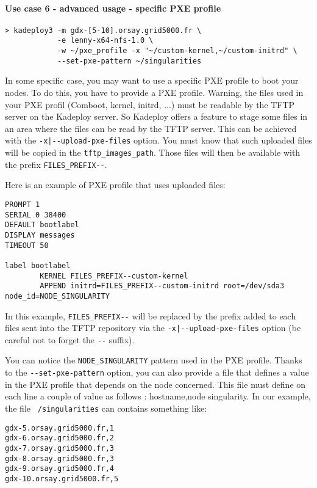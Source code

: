 \documentclass[a4wide,10pt,oneside]{book}
\begin{document}
\paragraph{Use case 6 - advanced usage - specific PXE profile}
\begin{verbatim}
> kadeploy3 -m gdx-[5-10].orsay.grid5000.fr \
            -e lenny-x64-nfs-1.0 \
            -w ~/pxe_profile -x "~/custom-kernel,~/custom-initrd" \
            --set-pxe-pattern ~/singularities
\end{verbatim}
In some specific case, you may want to use a specific PXE profile to boot your nodes. To do this, you have to provide a PXE profile. Warning, the files used in your PXE profil (Comboot, kernel, initrd, ...) must be readable by the TFTP server on the Kadeploy server. So Kadeploy offers a feature to stage some files in an area where the files can be read by the TFTP server. This can be achieved with the \texttt{-x|-{}-upload-pxe-files} option. You must know that such uploaded files will be copied in the \texttt{tftp\_images\_path}. Those files will then be available with the prefix \texttt{FILES\_PREFIX-{}-}.

Here is an example of PXE profile that uses uploaded files:
\begin{verbatim}
PROMPT 1
SERIAL 0 38400
DEFAULT bootlabel
DISPLAY messages
TIMEOUT 50

label bootlabel
        KERNEL FILES_PREFIX--custom-kernel
        APPEND initrd=FILES_PREFIX--custom-initrd root=/dev/sda3 node_id=NODE_SINGULARITY
\end{verbatim}

In this example, \texttt{FILES\_PREFIX-{}-} will be replaced by the prefix added to each files sent into the TFTP repository via the \texttt{-x|-{}-upload-pxe-files} option (be careful not to forget the \texttt{-{}-} suffix).

You can notice the \texttt{NODE\_SINGULARITY} pattern used in the PXE profile. Thanks to the \texttt{-{}-set-pxe-pattern} option, you can also provide a file that defines a value in the PXE profile that depends on the node concerned. This file must define on each line a couple of value as follows : hostname,node singularity. In our example, the file \texttt{~/singularities} can contains something like:
\begin{verbatim}
gdx-5.orsay.grid5000.fr,1
gdx-6.orsay.grid5000.fr,2
gdx-7.orsay.grid5000.fr,3
gdx-8.orsay.grid5000.fr,3
gdx-9.orsay.grid5000.fr,4
gdx-10.orsay.grid5000.fr,5
\end{verbatim}
\end{document}
